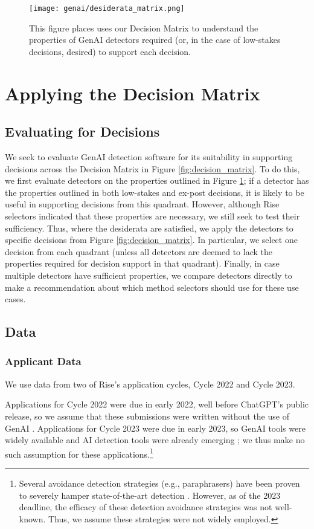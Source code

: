 \begin{figure}[htbp]
  \centering
  \texttt{[image: genai/desiderata\_matrix.png]}
  \caption{This figure places uses our Decision Matrix to understand the properties of GenAI detectors required (or, in the case of low-stakes decisions, desired) to support each decision.}
  \label{fig:desiderata_matrix}
\end{figure}

\section{Applying the Decision Matrix}\label{sec:data}
\subsection{Evaluating for Decisions}
We seek to evaluate GenAI detection software for its suitability in supporting decisions across the Decision Matrix in Figure \ref{fig:decision_matrix}. To do this, we first evaluate detectors on the properties outlined in Figure \ref{fig:desiderata_matrix}; if a detector has the properties outlined in both low-stakes and ex-post decisions, it is likely to be useful in supporting decisions from this quadrant. However, although Rise selectors indicated that these properties are necessary, we still seek to test their sufficiency. Thus, where the desiderata are satisfied, we apply the detectors to specific decisions from Figure \ref{fig:decision_matrix}. In particular, we select one decision from each quadrant (unless all detectors are deemed to lack the properties required for decision support in that quadrant). Finally, in case multiple detectors have sufficient properties, we compare detectors directly to make a recommendation about which method selectors should use for these use cases.

\subsection{Data}
\subsubsection{Applicant Data}\label{sssec:applicant_data}
We use data from two of Rise's application cycles, Cycle 2022 and Cycle 2023.

Applications for Cycle 2022 were due in early 2022, well before ChatGPT's public release, so we assume that these submissions were written without the use of GenAI \cite{openai_gpt-4_2023}. Applications for Cycle 2023 were due in early 2023, so GenAI tools were widely available and AI detection tools were already emerging \cite{kirchner_new_2023,gptzero_gptzero_2023,liu_deid-gpt_2023}; we thus make no such assumption for these applications.\footnote{Several avoidance detection strategies (e.g., paraphrasers) have been proven to severely hamper state-of-the-art detection \cite{kalpesh_krishna_paraphrasing_2023}. However, as of the 2023 deadline, the efficacy of these detection avoidance strategies was not well-known. Thus, we assume these strategies were not widely employed.}

